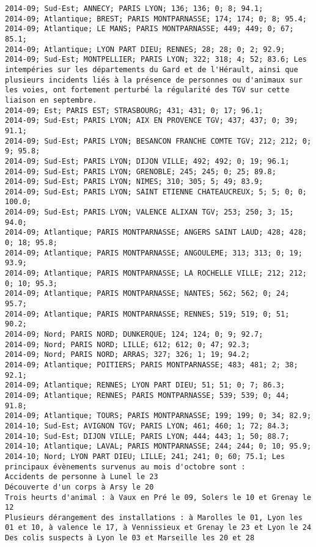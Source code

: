 \documentclass{article}
\begin{document}
\begin{Verbatim}[commandchars=\\\{\}]
2014-09; Sud-Est; ANNECY; PARIS LYON; 136; 136; 0; 8; 94.1; 
2014-09; Atlantique; BREST; PARIS MONTPARNASSE; 174; 174; 0; 8; 95.4; 
2014-09; Atlantique; LE MANS; PARIS MONTPARNASSE; 449; 449; 0; 67; 85.1; 
2014-09; Atlantique; LYON PART DIEU; RENNES; 28; 28; 0; 2; 92.9; 
2014-09; Sud-Est; MONTPELLIER; PARIS LYON; 322; 318; 4; 52; 83.6; Les intempéries sur les départements du Gard et de l'Hérault, ainsi que plusieurs incidents liés à la présence de personnes ou d'animaux sur les voies, ont fortement perturbé la régularité des TGV sur cette liaison en septembre.
2014-09; Est; PARIS EST; STRASBOURG; 431; 431; 0; 17; 96.1; 
2014-09; Sud-Est; PARIS LYON; AIX EN PROVENCE TGV; 437; 437; 0; 39; 91.1; 
2014-09; Sud-Est; PARIS LYON; BESANCON FRANCHE COMTE TGV; 212; 212; 0; 9; 95.8; 
2014-09; Sud-Est; PARIS LYON; DIJON VILLE; 492; 492; 0; 19; 96.1; 
2014-09; Sud-Est; PARIS LYON; GRENOBLE; 245; 245; 0; 25; 89.8; 
2014-09; Sud-Est; PARIS LYON; NIMES; 310; 305; 5; 49; 83.9; 
2014-09; Sud-Est; PARIS LYON; SAINT ETIENNE CHATEAUCREUX; 5; 5; 0; 0; 100.0; 
2014-09; Sud-Est; PARIS LYON; VALENCE ALIXAN TGV; 253; 250; 3; 15; 94.0; 
2014-09; Atlantique; PARIS MONTPARNASSE; ANGERS SAINT LAUD; 428; 428; 0; 18; 95.8; 
2014-09; Atlantique; PARIS MONTPARNASSE; ANGOULEME; 313; 313; 0; 19; 93.9; 
2014-09; Atlantique; PARIS MONTPARNASSE; LA ROCHELLE VILLE; 212; 212; 0; 10; 95.3; 
2014-09; Atlantique; PARIS MONTPARNASSE; NANTES; 562; 562; 0; 24; 95.7; 
2014-09; Atlantique; PARIS MONTPARNASSE; RENNES; 519; 519; 0; 51; 90.2; 
2014-09; Nord; PARIS NORD; DUNKERQUE; 124; 124; 0; 9; 92.7; 
2014-09; Nord; PARIS NORD; LILLE; 612; 612; 0; 47; 92.3; 
2014-09; Nord; PARIS NORD; ARRAS; 327; 326; 1; 19; 94.2; 
2014-09; Atlantique; POITIERS; PARIS MONTPARNASSE; 483; 481; 2; 38; 92.1; 
2014-09; Atlantique; RENNES; LYON PART DIEU; 51; 51; 0; 7; 86.3; 
2014-09; Atlantique; RENNES; PARIS MONTPARNASSE; 539; 539; 0; 44; 91.8; 
2014-09; Atlantique; TOURS; PARIS MONTPARNASSE; 199; 199; 0; 34; 82.9; 
2014-10; Sud-Est; AVIGNON TGV; PARIS LYON; 461; 460; 1; 72; 84.3; 
2014-10; Sud-Est; DIJON VILLE; PARIS LYON; 444; 443; 1; 50; 88.7; 
2014-10; Atlantique; LAVAL; PARIS MONTPARNASSE; 244; 244; 0; 10; 95.9; 
2014-10; Nord; LYON PART DIEU; LILLE; 241; 241; 0; 60; 75.1; Les principaux évènements survenus au mois d'octobre sont :
Accidents de personne à Lunel le 23
Découverte d'un corps à Arsy le 20
Trois heurts d'animal : à Vaux en Pré le 09, Solers le 10 et Grenay le 12
Plusieurs dérangement des installations : à Marolles le 01, Lyon les 01 et 10, à valence le 17, à Vennissieux et Grenay le 23 et Lyon le 24
Des colis suspects à Lyon le 03 et Marseille les 20 et 28 

\end{Verbatim}
\end{document}
